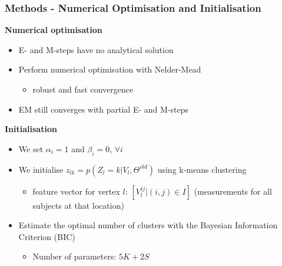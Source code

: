 \documentclass[8pt,xcolor=table]{beamer}
\begin{document}
\begin{frame}
\frametitle{Methods - Numerical Optimisation and Initialisation}

\textbf{Numerical optimisation} 
\begin{itemize}
\item E- and M-steps have no analytical solution
\item Perform numerical optimisation with Nelder-Mead
\begin{itemize}
  \item robust and fast convergence
\end{itemize}
\item EM still converges with partial E- and M-steps
\end{itemize}

\vfill

\textbf{Initialisation}

\begin{itemize}
 \item We set $\alpha_i=1$ and $\beta_i=0$, $\forall i$
 \item We initialise $z_{lk} = p(Z_l = k|V_l,\Theta^{old})$ using k-means clustering
 \begin{itemize}
  \item feature vector for vertex $l$: $\left[ V_l^{ij} | (i,j) \in I \right]$ (measurements for all subjects at that location)
 \end{itemize}

 \item Estimate the optimal number of clusters with the Bayesian Information Criterion (BIC)
 \begin{itemize}
  \item Number of parameters: $5K + 2S$
 \end{itemize}

\end{itemize}

\end{frame}

% 
% 
% 
% 
\end{document}
